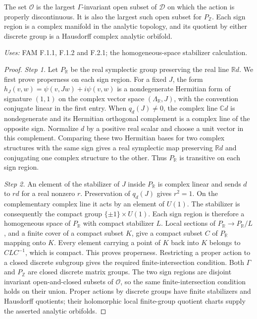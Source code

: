 \begin{theorem}[FAM F.2.2; T]\label{fam:F.2.2}
The set $\mathcal O$ is the largest $\Gamma$-invariant open subset of
$\mathcal D$ on which the action is properly discontinuous.  It is also
the largest such open subset for $P_{\mathbb Z}$.  Each sign region is
a complex manifold in the analytic topology, and its quotient by either
discrete group is a Hausdorff complex analytic orbifold.
\end{theorem}
\noindent\emph{Uses:} FAM F.1.1, F.1.2 and F.2.1; the homogeneous-space stabilizer calculation.\par

\begin{proof}
\par\noindent\textit{Step 1.} Let $P_{\mathbb R}$ be the real symplectic group preserving the real line
$\mathbb Rd$.  We first prove properness on each sign region.  For a fixed
$J$, the form
$h_J(v,w)=\psi(v,Jw)+i\psi(v,w)$ is a nondegenerate Hermitian form of
signature $(1,1)$ on the complex vector space $(\Lambda_{\mathbb R},J)$,
with the convention conjugate linear in the first entry.  When
$q_d(J)\ne0$, the complex line $\mathbb Cd$ is nondegenerate and its
Hermitian orthogonal complement is a complex line of the opposite sign.
Normalize $d$ by a positive real scalar and choose a unit vector in this
complement.  Comparing these two Hermitian bases for two complex
structures with the same sign gives a real symplectic map preserving
$\mathbb Rd$ and conjugating one complex structure to the other.  Thus
$P_{\mathbb R}$ is transitive on each sign region.

\par\noindent\textit{Step 2.} An element of the stabilizer of $J$ inside $P_{\mathbb R}$ is complex
linear and sends $d$ to $r d$ for a real nonzero $r$.  Preservation of
$q_d(J)$ gives $r^2=1$.  On the complementary complex line it acts by an
element of $U(1)$.  The stabilizer is consequently the compact group
$\{\pm1\}\times U(1)$.  Each sign region is therefore a homogeneous
space of $P_{\mathbb R}$ with compact stabilizer $L$.  Local sections of
$P_{\mathbb R}\to P_{\mathbb R}/L$, and a finite cover of a compact
subset $K$, give a compact subset $C$ of $P_{\mathbb R}$ mapping onto
$K$.  Every element carrying a point of $K$ back into $K$ belongs to
$CLC^{-1}$, which is compact.  This proves properness.  Restricting a
proper action to a closed discrete subgroup gives
the required finite-intersection condition.  Both $\Gamma$ and
$P_{\mathbb Z}$ are closed discrete matrix groups.  The two sign regions
are disjoint invariant open-and-closed subsets of $\mathcal O$, so the
same finite-intersection condition holds on their union.  Proper actions
by discrete groups have finite stabilizers and Hausdorff quotients; their
holomorphic local finite-group quotient charts supply the asserted
analytic orbifolds.


\end{proof}
